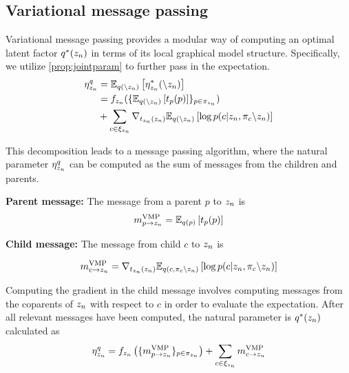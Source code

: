 \subsection{Variational message passing}

Variational message passing provides a modular way of
computing
an optimal latent factor $q^*(z_n)$
in terms of its local graphical model structure.
Specifically, we utilize \autoref{prop:jointparam}
to further pass in the expectation.
\begin{equation}
\begin{split}
    \eta^q_{z_n} &= \mathbb{E}_{q(\backslash z_n)}\left[\eta^*_{z_n}(\backslash z_n)\right] \\
                 &= f_{z_n}(\{\mathbb{E}_{q(\backslash z_n)}\left[t_p(p)\right]\}_{p \in \pi_{z_n}}) \\
                 &+ \sum_{c \in \xi_{z_n}} 
         \nabla_{t_{z_n}(z_n)} \mathbb{E}_{q(\backslash z_n)}\left[\log p(c | z_n, \pi_{c} \backslash z_n)\right]
\end{split}
\end{equation}

This decomposition leads to a message passing algorithm, where
the natural parameter $\eta^q_{z_n}$
can be computed as the sum of messages from the children and parents.

\textbf{Parent message:}
The message from a parent $p$ to $z_n$ is
\begin{equation} \label{eq:parentmessage}
    m^{\text{VMP}}_{p \rightarrow z_n} = \mathbb{E}_{q(p)}\left[t_p(p)\right]
\end{equation}

\textbf{Child message:}
The message from child $c$ to $z_n$ is

\begin{equation} \label{eq:childmessage}
    m^{\text{VMP}}_{c \rightarrow z_n} = \nabla_{t_{z_n}(z_n)} \mathbb{E}_{q(c, \pi_{c} \backslash z_n)}\left[\log p(c | z_n, \pi_{c} \backslash z_n)\right]
\end{equation}

Computing the gradient in the child message involves
computing messages from the coparents of $z_n$ with respect to $c$ in order to evaluate the expectation.
After all relevant messages
have been computed, the natural parameter is $q^*(z_n)$ calculated as
\begin{equation}
    \label{eq:vmpparam}
   \eta^q_{z_n} = f_{z_n}\left(\{m^{\text{VMP}}_{p \rightarrow z_n}\}_{p \in \pi_{z_n}}\right) + \sum_{c \in \xi_{z_n}} m^{\text{VMP}}_{c \rightarrow z_n}
\end{equation}

